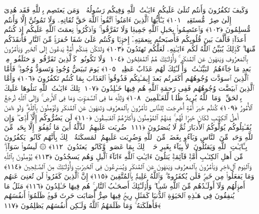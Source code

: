  وَكَيفَ تَكفُرُونَ وَأَنتُم تُتلَىٰ عَلَيكُم ءَايَـٰتُ ٱللَّهِ وَفِيكُم رَسُولُهُۥ ۗ وَمَن يَعتَصِم بِٱللَّهِ فَقَد هُدِىَ إِلَىٰ صِرَٰطٍۢ مُّستَقِيمٍۢ ﴿١٠١﴾
 يَـٰٓأَيُّهَا ٱلَّذِينَ ءَامَنُوا۟ ٱتَّقُوا۟ ٱللَّهَ حَقَّ تُقَاتِهِۦ وَلَا تَمُوتُنَّ إِلَّا وَأَنتُم مُّسلِمُونَ ﴿١٠٢﴾
 وَٱعتَصِمُوا۟ بِحَبلِ ٱللَّهِ جَمِيعًۭا وَلَا تَفَرَّقُوا۟ ۚ وَٱذكُرُوا۟ نِعمَتَ ٱللَّهِ عَلَيكُم إِذ كُنتُم أَعدَآءًۭ فَأَلَّفَ بَينَ قُلُوبِكُم فَأَصبَحتُم بِنِعمَتِهِۦٓ إِخوَٟنًۭا وَكُنتُم عَلَىٰ شَفَا حُفرَةٍۢ مِّنَ ٱلنَّارِ فَأَنقَذَكُم مِّنهَا ۗ كَذَٟلِكَ يُبَيِّنُ ٱللَّهُ لَكُم ءَايَـٰتِهِۦ لَعَلَّكُم تَهتَدُونَ ﴿١٠٣﴾
 وَلتَكُن مِّنكُم أُمَّةٌۭ يَدعُونَ إِلَى ٱلخَيرِ وَيَأمُرُونَ بِٱلمَعرُوفِ وَيَنهَونَ عَنِ ٱلمُنكَرِ ۚ وَأُو۟لَـٰٓئِكَ هُمُ ٱلمُفلِحُونَ ﴿١٠٤﴾
 وَلَا تَكُونُوا۟ كَٱلَّذِينَ تَفَرَّقُوا۟ وَٱختَلَفُوا۟ مِنۢ بَعدِ مَا جَآءَهُمُ ٱلبَيِّنَـٰتُ ۚ وَأُو۟لَـٰٓئِكَ لَهُم عَذَابٌ عَظِيمٌۭ ﴿١٠٥﴾
 يَومَ تَبيَضُّ وُجُوهٌۭ وَتَسوَدُّ وُجُوهٌۭ ۚ فَأَمَّا ٱلَّذِينَ ٱسوَدَّت وُجُوهُهُم أَكَفَرتُم بَعدَ إِيمَـٰنِكُم فَذُوقُوا۟ ٱلعَذَابَ بِمَا كُنتُم تَكفُرُونَ ﴿١٠٦﴾
 وَأَمَّا ٱلَّذِينَ ٱبيَضَّت وُجُوهُهُم فَفِى رَحمَةِ ٱللَّهِ هُم فِيهَا خَـٰلِدُونَ ﴿١٠٧﴾
 تِلكَ ءَايَـٰتُ ٱللَّهِ نَتلُوهَا عَلَيكَ بِٱلحَقِّ ۗ وَمَا ٱللَّهُ يُرِيدُ ظُلمًۭا لِّلعَـٰلَمِينَ ﴿١٠٨﴾
 وَلِلَّهِ مَا فِى ٱلسَّمَـٰوَٟتِ وَمَا فِى ٱلأَرضِ ۚ وَإِلَى ٱللَّهِ تُرجَعُ ٱلأُمُورُ ﴿١٠٩﴾
 كُنتُم خَيرَ أُمَّةٍ أُخرِجَت لِلنَّاسِ تَأمُرُونَ بِٱلمَعرُوفِ وَتَنهَونَ عَنِ ٱلمُنكَرِ وَتُؤمِنُونَ بِٱللَّهِ ۗ وَلَو ءَامَنَ أَهلُ ٱلكِتَـٰبِ لَكَانَ خَيرًۭا لَّهُم ۚ مِّنهُمُ ٱلمُؤمِنُونَ وَأَكثَرُهُمُ ٱلفَـٰسِقُونَ ﴿١١٠﴾
 لَن يَضُرُّوكُم إِلَّآ أَذًۭى ۖ وَإِن يُقَـٰتِلُوكُم يُوَلُّوكُمُ ٱلأَدبَارَ ثُمَّ لَا يُنصَرُونَ ﴿١١١﴾
 ضُرِبَت عَلَيهِمُ ٱلذِّلَّةُ أَينَ مَا ثُقِفُوٓا۟ إِلَّا بِحَبلٍۢ مِّنَ ٱللَّهِ وَحَبلٍۢ مِّنَ ٱلنَّاسِ وَبَآءُو بِغَضَبٍۢ مِّنَ ٱللَّهِ وَضُرِبَت عَلَيهِمُ ٱلمَسكَنَةُ ۚ ذَٟلِكَ بِأَنَّهُم كَانُوا۟ يَكفُرُونَ بِـَٔايَـٰتِ ٱللَّهِ وَيَقتُلُونَ ٱلأَنۢبِيَآءَ بِغَيرِ حَقٍّۢ ۚ ذَٟلِكَ بِمَا عَصَوا۟ وَّكَانُوا۟ يَعتَدُونَ ﴿١١٢﴾
 ۞ لَيسُوا۟ سَوَآءًۭ ۗ مِّن أَهلِ ٱلكِتَـٰبِ أُمَّةٌۭ قَآئِمَةٌۭ يَتلُونَ ءَايَـٰتِ ٱللَّهِ ءَانَآءَ ٱلَّيلِ وَهُم يَسجُدُونَ ﴿١١٣﴾
 يُؤمِنُونَ بِٱللَّهِ وَٱليَومِ ٱلءَاخِرِ وَيَأمُرُونَ بِٱلمَعرُوفِ وَيَنهَونَ عَنِ ٱلمُنكَرِ وَيُسَـٰرِعُونَ فِى ٱلخَيرَٰتِ وَأُو۟لَـٰٓئِكَ مِنَ ٱلصَّـٰلِحِينَ ﴿١١٤﴾
 وَمَا يَفعَلُوا۟ مِن خَيرٍۢ فَلَن يُكفَرُوهُ ۗ وَٱللَّهُ عَلِيمٌۢ بِٱلمُتَّقِينَ ﴿١١٥﴾
 إِنَّ ٱلَّذِينَ كَفَرُوا۟ لَن تُغنِىَ عَنهُم أَموَٟلُهُم وَلَآ أَولَـٰدُهُم مِّنَ ٱللَّهِ شَيـًۭٔا ۖ وَأُو۟لَـٰٓئِكَ أَصحَـٰبُ ٱلنَّارِ ۚ هُم فِيهَا خَـٰلِدُونَ ﴿١١٦﴾
 مَثَلُ مَا يُنفِقُونَ فِى هَـٰذِهِ ٱلحَيَوٰةِ ٱلدُّنيَا كَمَثَلِ رِيحٍۢ فِيهَا صِرٌّ أَصَابَت حَرثَ قَومٍۢ ظَلَمُوٓا۟ أَنفُسَهُم فَأَهلَكَتهُ ۚ وَمَا ظَلَمَهُمُ ٱللَّهُ وَلَـٰكِن أَنفُسَهُم يَظلِمُونَ ﴿١١٧﴾

